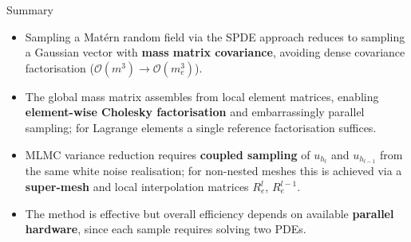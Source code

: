\documentclass[
  english,            %
  aspectratio=169,    %
]{tumbeamer}
\begin{document}

\begin{frame}{Summary}
  \begin{itemize}
    \item[\textbullet] Sampling a Mat\'ern random field via the SPDE approach reduces to
      sampling a Gaussian vector with \textbf{mass matrix covariance}, avoiding dense
      covariance factorisation ($\mathcal{O}(m^3) \to \mathcal{O}(m_e^3)$).\bigskip

    \item[\textbullet] The global mass matrix assembles from local element matrices, enabling
      \textbf{element-wise Cholesky factorisation} and embarrassingly parallel sampling;
      for Lagrange elements a single reference factorisation suffices.\bigskip

    \item[\textbullet] MLMC variance reduction requires \textbf{coupled sampling} of
      $u_{h_l}$ and $u_{h_{l-1}}$ from the same white noise realisation; for non-nested
      meshes this is achieved via a \textbf{super-mesh} and local interpolation matrices
      $R_e^l$, $R_e^{l-1}$.\bigskip

    \item[\textbullet] The method is effective but overall efficiency depends on available
      \textbf{parallel hardware}, since each sample requires solving two PDEs.
  \end{itemize}
\end{frame}

\end{document}

